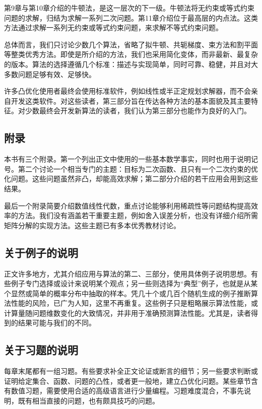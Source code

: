 第9章与第10章介绍的牛顿法，是这一层次的下一级。牛顿法将无约束或等式约束问题的求解，归结为求解一系列二次问题。第11章介绍位于最高层的内点法。这类方法通过求解一系列无约束或等式约束问题，来求解不等式约束问题。

总体而言，我们只讨论少数几个算法，省略了拟牛顿、共轭梯度、束方法和割平面等整类优秀方法。即使是所介绍的方法，我们也采用简化变体，而非最新、最复杂的版本。算法的选择遵循几个标准：描述与实现简单，同时可靠、稳健，并且对大多数问题足够有效、足够快。

许多凸优化使用者最终会使用标准软件，例如线性或半正定规划求解器，而不会亲自开发这类软件。对这些读者，第三部分旨在传达各种方法的基本面貌及其主要特征。对少数最终会开发新算法的读者，我们认为第三部分也能作为良好的入门。

\subsection{附录}
本书有三个附录。第一个列出正文中使用的一些基本数学事实，同时也用于说明记号。第二个讨论一个相当专门的主题：目标为二次函数、且只有一个二次约束的优化问题。这些问题虽然非凸，却能高效求解；第二部分介绍的若干应用会用到这些结果。

最后一个附录简要介绍数值线性代数，重点讨论能够利用稀疏性等问题结构提高效率的方法。我们没有涵盖若干重要主题，例如舍入误差分析，也没有详细介绍所需矩阵分解的实现方法。这些主题已有多本优秀教材讨论。

\subsection{关于例子的说明}
正文许多地方，尤其介绍应用与算法的第二、三部分，使用具体例子说明思想。有些例子专门选择或设计来说明某个观点；另一些则选择为“典型”例子，也就是从某个显然或简单的概率分布中抽取的样本。凭几十个或几百个随机生成的例子推断算法性能的风险，已广为人知，这里不再重复。这些例子只是粗略展示算法性能，或计算量随问题维数变化的大致情况，并非用于准确预测算法性能。尤其是，读者得到的结果可能与我们的不同。

\subsection{关于习题的说明}
每章末尾都有一组习题。有些要求补全正文论证或断言的细节；另一些要求判断或证明给定集合、函数、问题的凸性，或者更一般地，建立凸优化问题。某些章节含有数值习题，需要使用合适的高级语言进行少量编程。习题难度混合，不事先说明，既有相当直接的问题，也有颇具技巧的问题。

